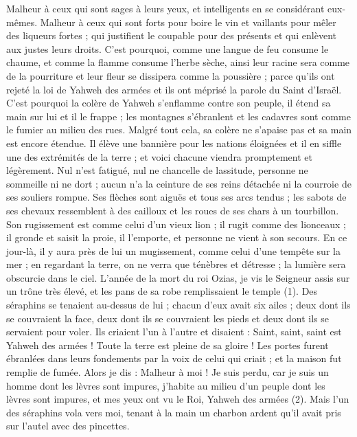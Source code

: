 \begin{multicols}{2}
Malheur à ceux qui sont sages à leurs yeux, et intelligents en se considérant eux-mêmes.
Malheur à ceux qui sont forts pour boire le vin et vaillants pour mêler des liqueurs fortes ;
qui justifient le coupable pour des présents et qui enlèvent aux justes leurs droits.
C'est pourquoi, comme une langue de feu consume le chaume, et comme la flamme consume l’herbe sèche, ainsi leur racine sera comme de la pourriture et leur fleur se dissipera comme la poussière ; parce qu'ils ont rejeté la loi de Yahweh des armées et ils ont méprisé la parole du Saint d'Israël.
C'est pourquoi la colère de Yahweh s’enflamme contre son peuple, il étend sa main sur lui et il le frappe ; les montagnes s’ébranlent et les cadavres sont comme le fumier au milieu des rues. Malgré tout cela, sa colère ne s’apaise pas et sa main est encore étendue.
Il élève une bannière pour les nations éloignées et il en siffle une des extrémités de la terre ; et voici chacune viendra promptement et légèrement.
Nul n’est fatigué, nul ne chancelle de lassitude, personne ne sommeille ni ne dort ; aucun n’a la ceinture de ses reins détachée ni la courroie de ses souliers rompue.
Ses flèches sont aiguës et tous ses arcs tendus ; les sabots de ses chevaux ressemblent à des cailloux et les roues de ses chars à un tourbillon.
Son rugissement est comme celui d’un vieux lion ; il rugit comme des lionceaux ; il gronde et saisit la proie, il l'emporte, et personne ne vient à son secours.
En ce jour-là, il y aura près de lui un mugissement, comme celui d’une tempête sur la mer ; en regardant la terre, on ne verra que ténèbres et détresse ; la lumière sera obscurcie dans le ciel.
\VerseOne{}L'année de la mort du roi Ozias, je vis le Seigneur assis sur un trône très élevé, et les pans de sa robe remplissaient le temple (1).
Des séraphins se tenaient au-dessus de lui ; chacun d'eux avait six ailes ; deux dont ils se couvraient la face, deux dont ils se couvraient les pieds et deux dont ils se servaient pour voler.
Ils criaient l'un à l'autre et disaient : Saint, saint, saint est Yahweh des armées ! Toute la terre est pleine de sa gloire !
Les portes furent ébranlées dans leurs fondements par la voix de celui qui criait ; et la maison fut remplie de fumée.
Alors je dis : Malheur à moi ! Je suis perdu, car je suis un homme dont les lèvres sont impures, j’habite au milieu d’un peuple dont les lèvres sont impures, et mes yeux ont vu le Roi, Yahweh des armées (2).
Mais l'un des séraphins vola vers moi, tenant à la main un charbon ardent qu'il avait pris sur l'autel avec des pincettes.

\end{multicols}
